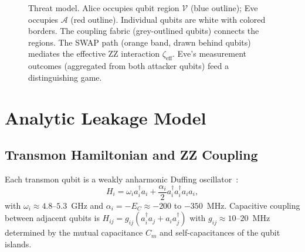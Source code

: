 \documentclass[ASNA,twocolumn]{USG}
\begin{document}
\begin{figure}[t]
\caption{Threat model. Alice occupies qubit region $\mathcal{V}$ (blue outline); Eve occupies $\mathcal{A}$ (red outline). Individual qubits are white with colored borders. The coupling fabric (grey-outlined qubits) connects the regions. The SWAP path (orange band, drawn behind qubits) mediates the effective ZZ interaction $\zeta_{\mathrm{eff}}$. Eve's measurement outcomes (aggregated from both attacker qubits) feed a distinguishing game.}
\label{fig:threat_model}
\end{figure}

\section{Analytic Leakage Model}
\label{sec:model}

\subsection{Transmon Hamiltonian and ZZ Coupling}

Each transmon qubit is a weakly anharmonic Duffing oscillator~\cite{koch2007transmon,krantz2019guide}:
\begin{equation}
    H_i = \omega_i a_i^\dagger a_i + \frac{\alpha_i}{2} a_i^\dagger a_i^\dagger a_i a_i,
\label{eq:transmon}
\end{equation}
with $\omega_i \approx 4.8$--$5.3$~GHz and $\alpha_i = -E_C \approx -200$ to $-350$~MHz. Capacitive coupling between adjacent qubits is $H_{ij} = g_{ij}(a_i^\dagger a_j + a_i a_j^\dagger)$ with $g_{ij} \approx 10$--$20$~MHz determined by the mutual capacitance $C_m$ and self-capacitances of the qubit islands.
\end{document}
